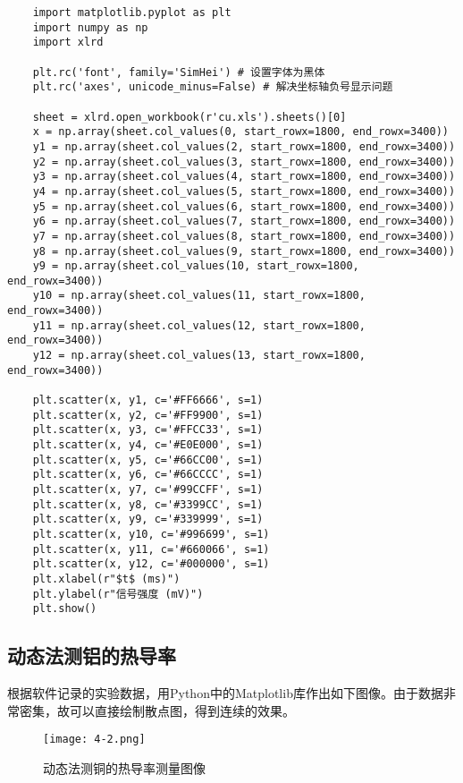 \documentclass[12pt]{article}
\begin{document}
\begin{lstlisting}
    import matplotlib.pyplot as plt
    import numpy as np
    import xlrd
    
    plt.rc('font', family='SimHei') # 设置字体为黑体
    plt.rc('axes', unicode_minus=False) # 解决坐标轴负号显示问题
    
    sheet = xlrd.open_workbook(r'cu.xls').sheets()[0]
    x = np.array(sheet.col_values(0, start_rowx=1800, end_rowx=3400))
    y1 = np.array(sheet.col_values(2, start_rowx=1800, end_rowx=3400))
    y2 = np.array(sheet.col_values(3, start_rowx=1800, end_rowx=3400))
    y3 = np.array(sheet.col_values(4, start_rowx=1800, end_rowx=3400))
    y4 = np.array(sheet.col_values(5, start_rowx=1800, end_rowx=3400))
    y5 = np.array(sheet.col_values(6, start_rowx=1800, end_rowx=3400))
    y6 = np.array(sheet.col_values(7, start_rowx=1800, end_rowx=3400))
    y7 = np.array(sheet.col_values(8, start_rowx=1800, end_rowx=3400))
    y8 = np.array(sheet.col_values(9, start_rowx=1800, end_rowx=3400))
    y9 = np.array(sheet.col_values(10, start_rowx=1800, end_rowx=3400))
    y10 = np.array(sheet.col_values(11, start_rowx=1800, end_rowx=3400))
    y11 = np.array(sheet.col_values(12, start_rowx=1800, end_rowx=3400))
    y12 = np.array(sheet.col_values(13, start_rowx=1800, end_rowx=3400))
    
    plt.scatter(x, y1, c='#FF6666', s=1)
    plt.scatter(x, y2, c='#FF9900', s=1)
    plt.scatter(x, y3, c='#FFCC33', s=1)
    plt.scatter(x, y4, c='#E0E000', s=1)
    plt.scatter(x, y5, c='#66CC00', s=1)
    plt.scatter(x, y6, c='#66CCCC', s=1)
    plt.scatter(x, y7, c='#99CCFF', s=1)
    plt.scatter(x, y8, c='#3399CC', s=1)
    plt.scatter(x, y9, c='#339999', s=1)
    plt.scatter(x, y10, c='#996699', s=1)
    plt.scatter(x, y11, c='#660066', s=1)
    plt.scatter(x, y12, c='#000000', s=1)
    plt.xlabel(r"$t$ (ms)")
    plt.ylabel(r"信号强度 (mV)")
    plt.show()
\end{lstlisting}

\subsection{动态法测铝的热导率}
根据软件记录的实验数据，用Python中的Matplotlib库作出如下图像。由于数据非常密集，故可以直接绘制散点图，得到连续的效果。

\begin{figure}[htbp]
    \centering
    \texttt{[image: 4-2.png]}
    \caption{动态法测铜的热导率测量图像}
\end{figure}
\end{document}
